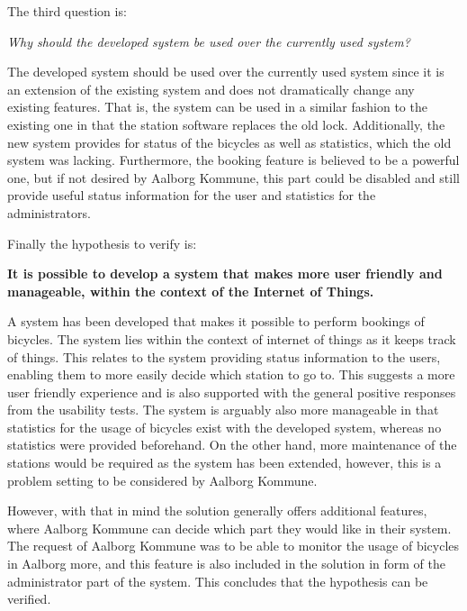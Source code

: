 The third question is:
\begin{center}
	\textit{Why should the developed system be used over the currently used system?}
\end{center}
The developed system should be used over the currently used system since it is an extension of the existing system and does not dramatically change any existing features.
That is, the system can be used in a similar fashion to the existing one in that the station software replaces the old lock. Additionally, the new system provides for status of the bicycles as well as statistics, which the old system was lacking. Furthermore, the booking feature is believed to be a powerful one, but if not desired by Aalborg Kommune, this part could be disabled and still provide useful status information for the user and statistics for the administrators.

Finally the hypothesis to verify is:
\begin{center}
	\textbf{It is possible to develop a system that makes \bycykel more user friendly and manageable, within the context of the Internet of Things.}
\end{center}

A system has been developed that makes it possible to perform bookings of bicycles.
The system lies within the context of internet of things as it keeps track of things.
This relates to  the system providing status information to the users, enabling them to more easily decide which station to go to.
This suggests a more user friendly experience and is also supported with the general positive responses from the usability tests.
The system is arguably also more manageable in that statistics for the usage of bicycles exist with the developed system, whereas no statistics were provided beforehand.
On the other hand, more maintenance of the stations would be required as the system has been extended, however, this is a problem setting to be considered by Aalborg Kommune.
 
However, with that in mind the solution generally offers additional features, where Aalborg Kommune can decide which part they would like in their system.
The request of Aalborg Kommune was to be able to monitor the usage of bicycles in Aalborg more, and this feature is also included in the solution in form of the administrator part of the system.
This concludes that the hypothesis can be verified.